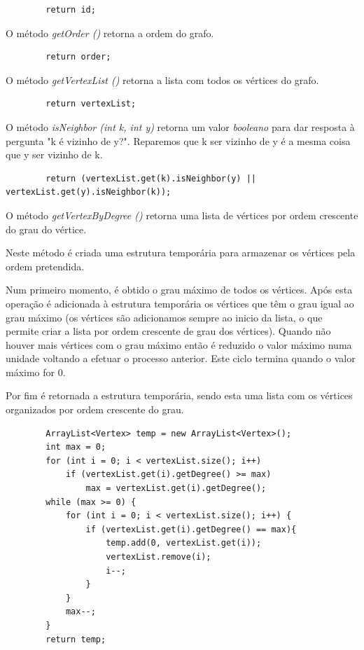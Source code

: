 \documentclass[a4paper,12pt]{report}
\begin{document}
\begin{lstlisting}
        return id;
\end{lstlisting}

O método \textit{getOrder ()} retorna a ordem do grafo.

\begin{lstlisting}
        return order;
\end{lstlisting}

O método \textit{getVertexList ()} retorna a lista com todos os vértices do grafo.

\begin{lstlisting}
        return vertexList;
\end{lstlisting}

O método \textit{isNeighbor (int k, int y)} retorna um valor \textit{booleano} para dar resposta à pergunta "k é vizinho de y?". Reparemos que k ser vizinho de y é a mesma coisa que y ser vizinho de k.

\begin{lstlisting}
        return (vertexList.get(k).isNeighbor(y) || vertexList.get(y).isNeighbor(k));
\end{lstlisting}


O método \textit{getVertexByDegree ()} retorna uma lista de vértices por ordem crescente do grau do vértice.

Neste método é criada uma estrutura temporária para armazenar os vértices pela ordem pretendida.

Num primeiro momento, é obtido o grau máximo de todos os vértices. Após esta operação é adicionada à estrutura temporária os vértices que têm o grau igual ao grau máximo (os vértices são adicionamos sempre ao inicio da lista, o que permite criar a lista por ordem crescente de grau dos vértices). Quando não houver mais vértices com o grau máximo então é reduzido o valor máximo numa unidade voltando a efetuar o processo anterior. Este ciclo termina quando o valor máximo for 0.

Por fim é retornada a estrutura temporária, sendo esta uma lista com os vértices organizados por ordem crescente do grau.

\begin{lstlisting}
        ArrayList<Vertex> temp = new ArrayList<Vertex>();
        int max = 0;
        for (int i = 0; i < vertexList.size(); i++)
            if (vertexList.get(i).getDegree() >= max) 
                max = vertexList.get(i).getDegree();
        while (max >= 0) {
            for (int i = 0; i < vertexList.size(); i++) {
                if (vertexList.get(i).getDegree() == max){
                    temp.add(0, vertexList.get(i));
                    vertexList.remove(i);
                    i--;
                }
            }       
            max--;
        }
        return temp;
\end{lstlisting}
\end{document}
